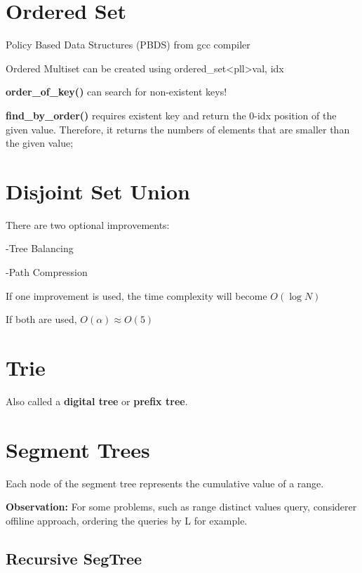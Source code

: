 \section{Ordered Set}

    Policy Based Data Structures (PBDS) from gcc compiler

    Ordered Multiset can be created using ordered\_set\textless pll\textgreater {val, idx}

    \textbf{order\_of\_key()} can search for non-existent keys!
    
    \textbf{find\_by\_order()} requires existent key and return the 0-idx position of the given value.
    Therefore, it returns the numbers of elements that are smaller than the given value;


\section{Disjoint Set Union}

    There are two optional improvements:

        -Tree Balancing 
        
        -Path Compression

    If one improvement is used, 
    the time complexity will become $O(\log{N})$

    If both are used, $O(\alpha) \approx O(5)$


\section{Trie}

    Also called a \textbf{digital tree} or \textbf{prefix tree}.
    

\section{Segment Trees}

    Each node of the segment tree represents the cumulative value of a range.

    \textbf{Observation:} For some problems, such as range distinct values query,
    considerer offiline approach, ordering the queries by L for example. 

    \subsection{Recursive SegTree}

